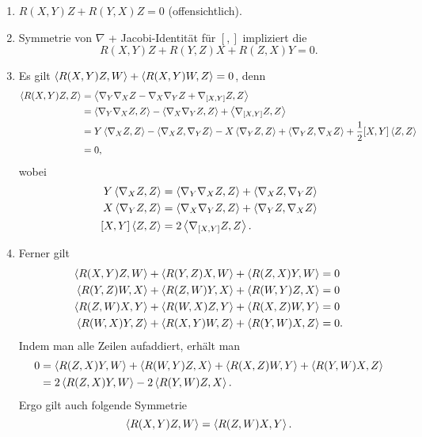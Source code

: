 \begin{enumerate}[1)]
	\item $R(X,Y)Z + R(Y,X) Z = 0$ (offensichtlich).
	\item Symmetrie von $\nabla$ + Jacobi-Identität für $[,]$ impliziert die 
	\[ R(X,Y)Z + R(Y,Z)X  + R(Z,X)Y = 0. \]
	\item Es gilt $\left<R(X,Y)Z, W\right> + \left<R(X,Y)W, Z\right> = 0 $, denn
	\begin{align*}
	\left<R(X,Y)Z,Z\right> &= \left< \nabla_{Y} \nabla_{X} Z - \nabla_{X} \nabla_{Y} Z + \nabla_{[X,Y]} Z, Z \right>\\
	&= \left<\nabla_{Y} \nabla_{X} Z, Z\right>  - \left<\nabla_{X} \nabla_{Y}Z, Z \right> + \left<\nabla_{[X,Y]} Z, Z\right>\\
	&= Y\left<\nabla_{X} Z, Z\right>
	- \left<\nabla_{X} Z, \nabla_{Y} Z\right>
	- X\left<\nabla_{Y} Z, Z \right>
	+ \left<\nabla_Y Z, \nabla_{X} Z\right>
	+ \frac{1}{2} [X,Y] \left<Z,Z\right>\\
	&= 0,
	\end{align*}
	wobei
	\begin{align*}
	Y\left<\nabla_XZ,Z\right> &= \left< \nabla_{Y} \nabla_{X} Z, Z \right> + \left<\nabla_{X} Z, \nabla_{Y} Z\right>\\
	X\left<\nabla_YZ,Z\right> &= \left< \nabla_{X} \nabla_{Y} Z, Z \right> + \left<\nabla_{Y} Z, \nabla_{X} Z\right>\\
	[X,Y] \left<Z,Z\right> &= 2 \left< \nabla_{[X,Y]} Z,Z \right>.
	\end{align*}
	\item Ferner gilt
	\begin{align*}
	\left<R(X,Y)Z, W\right> + \left< R(Y,Z)X ,W\right> + \left< R(Z,X)Y , W\right> &= 0\\
	\left<R(Y,Z)W, X\right> + \left< R(Z,W)Y ,X\right> + \left< R(W,Y)Z , X\right> &= 0\\
	\left<R(Z,W)X, Y\right> + \left< R(W,X)Z ,Y\right> + \left< R(X,Z)W , Y\right> &= 0\\
	\left<R(W,X)Y, Z\right> + \left< R(X,Y)W ,Z\right> + \left< R(Y,W)X , Z\right> &= 0.
	\end{align*}
	Indem man alle Zeilen aufaddiert, erhält man
	\begin{align*}
	0 &= \left< R(Z,X)Y , W\right> + \left< R(W,Y)Z , X\right> + \left< R(X,Z)W , Y\right> +\left< R(Y,W)X , Z\right>  \\
	&= 2 \left<R(Z,X)Y,W\right> - 2 \left< R(Y,W)Z,X \right>.
	\end{align*}
	Ergo gilt auch folgende Symmetrie
	\[ \left<R(X,Y)Z, W\right> = \left<R(Z,W)X,Y\right>.  \]
\end{enumerate}

